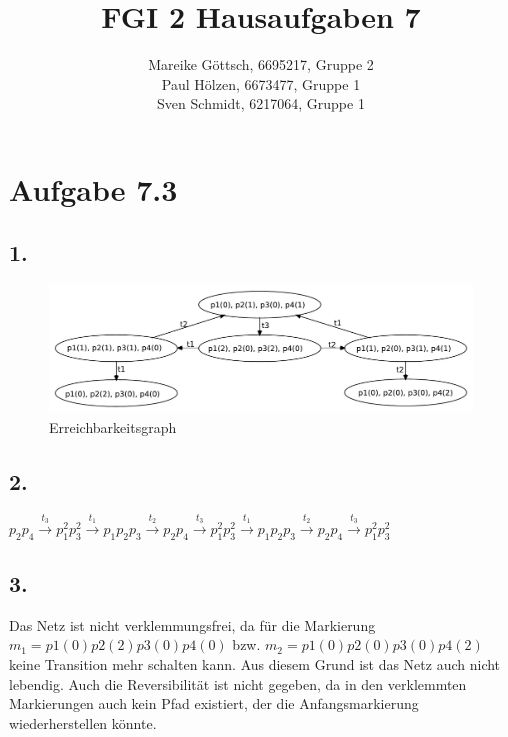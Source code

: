 \documentclass[12pt, paper=a4]{article}
\author{Mareike G\"ottsch, 6695217, Gruppe 2\\Paul H\"olzen, 6673477, Gruppe 1\\Sven Schmidt, 6217064, Gruppe 1}
\title{FGI 2 Hausaufgaben 7}
\begin{document}
\maketitle

\section*{Aufgabe 7.3}
\subsection*{1.}
\begin{figure}[h!]
\centering
\includegraphics[scale=0.6]{Erreichbarkeitsgraph7-3-1.pdf}
\caption{Erreichbarkeitsgraph}
\end{figure}

\subsection*{2.}
$p_2p_4 \overset{t_3}{\rightarrow} p_1^2p_3^2 \overset{t_1}{\rightarrow} p_1p_2p_3
\overset{t_2}{\rightarrow} p_2p_4 \overset{t_3}{\rightarrow} p_1^2p_3^2 \overset{t_1}{\rightarrow} p_1p_2p_3 \overset{t_2}{\rightarrow} p_2p_4 \overset{t_3}{\rightarrow} p_1^2p_3^2$\\

\subsection*{3.}
Das Netz ist nicht verklemmungsfrei, da für die Markierung $m_1 = p1(0)p2(2)p3(0)p4(0)$ bzw. $m_2 = p1(0)p2(0)p3(0)p4(2)$ keine Transition mehr schalten kann. Aus diesem Grund ist das Netz auch nicht lebendig. Auch die Reversibilität ist nicht gegeben, da in den verklemmten Markierungen auch kein Pfad existiert, der die Anfangsmarkierung wiederherstellen könnte.\\
\end{document}
